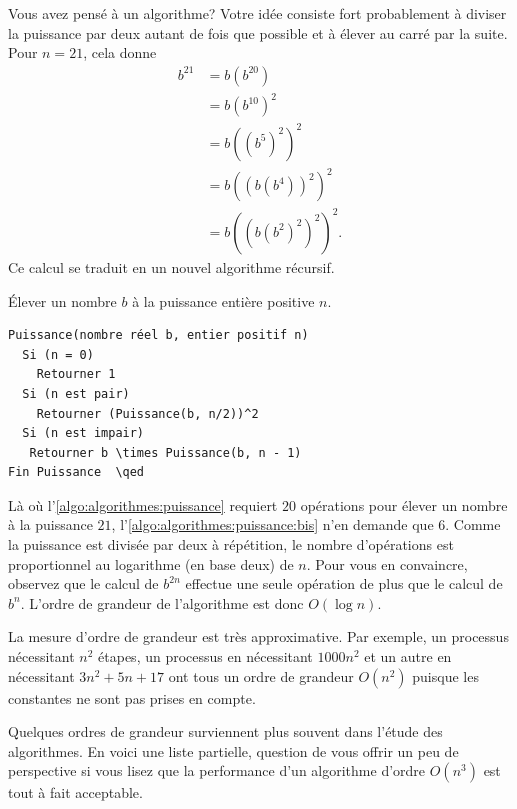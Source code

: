 Vous avez pensé à un algorithme? Votre idée consiste fort probablement
à diviser la puissance par deux autant de fois que possible et à
élever au carré par la suite. Pour $n = 21$, cela donne
\begin{align*}
  b^{21}
  &= b (b^{20}) \\
  & = b (b^{10})^2 \\
  &= b ((b^5)^2)^2 \\
  & = b ((b (b^4))^2)^2 \\
  &= b ((b (b^2)^2)^2)^2.
\end{align*}
Ce calcul se traduit en un nouvel algorithme récursif.

\begin{algorithmebis}
  \label{algo:algorithmes:puissance:bis}
  Élever un nombre $b$ à la puissance entière positive $n$.
  \begin{pseudocode}
\begin{Verbatim}[commandchars=\\\{\}]
Puissance(nombre réel b, entier positif n)
  Si (n = 0)
    Retourner 1
  Si (n est pair)
    Retourner (Puissance(b, n/2))^2
  Si (n est impair)
   Retourner b \times Puissance(b, n - 1)
Fin Puissance  \qed
\end{Verbatim}
  \end{pseudocode}
\end{algorithmebis}

Là où l'\autoref{algo:algorithmes:puissance} requiert $20$ opérations
pour élever un nombre à la puissance $21$,
l'\autoref{algo:algorithmes:puissance:bis} n'en demande que $6$. Comme
la puissance est divisée par deux à répétition, le nombre d'opérations
est proportionnel au logarithme (en base deux) de $n$. Pour vous en
convaincre, observez que le calcul de $b^{2n}$ effectue une seule
opération de plus que le calcul de $b^n$. L'ordre de grandeur de
l'algorithme est donc $O(\log n)$.

La mesure d'ordre de grandeur est très approximative. Par exemple, un
processus nécessitant $n^2$ étapes, un processus en nécessitant
$1000n^2$ et un autre en nécessitant $3n^2 + 5n + 17$ ont tous un
ordre de grandeur $O(n^2)$ puisque les constantes ne sont pas prises
en compte.

Quelques ordres de grandeur surviennent plus souvent dans l'étude des
algorithmes. En voici une liste partielle, question de vous offrir un
peu de perspective si vous lisez que la performance d'un algorithme
d'ordre $O(n^3)$ est tout à fait acceptable.

